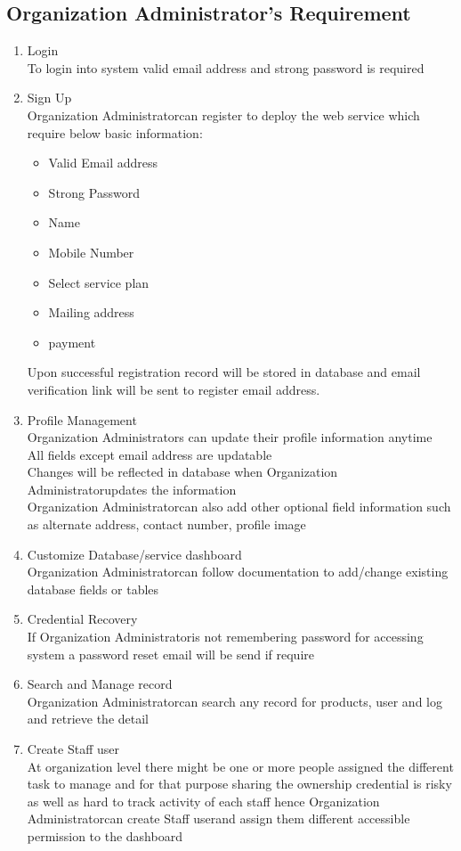 \documentclass{report}
\newcommand*\arrow{\item[$\Rightarrow$]}
\def\admin{Organization Administrator}
\def\staff{Staff user}
\begin{document}
\subsection{\admin's Requirement}
\begin{enumerate}[start=1,label={\bfseries REQ \arabic*:}]
	\addtolength{\itemindent}{40pt}
	\item Login
		\\To login into system valid email address and strong password is required
	\item Sign Up
		\\ \admin \space can register to deploy the web service which require below basic information:
		\begin{itemize}
			\arrow Valid Email address
			\arrow Strong Password
			\arrow Name
			\arrow Mobile Number
			\arrow Select service plan
			\arrow Mailing address
			\arrow payment
		\end{itemize}
		Upon successful registration record will be stored in database and email verification link will be sent to register email address.
	\item Profile Management
		\\ \admin s can update their profile information anytime
		\\All fields except email address are updatable
		\\Changes will be reflected in database when \admin \space updates the information
		\\ \admin can also add other optional field information such as alternate address, contact number, profile image
	\item Customize Database/service dashboard
		\\ \admin \space can follow documentation to add/change existing database fields or tables
	\item Credential Recovery
		\\If \admin \space is not remembering password for accessing system a password reset email will be send if require 
	\item Search and Manage record
		\\ \admin \space can search any record for products, user and log and retrieve the detail 
	\item Create \staff
		\\At organization level there might be one or more people assigned the different task to manage and for that purpose sharing the ownership credential is risky as well as hard to track activity of each staff hence \admin \space can create \staff \space and assign them different accessible permission to the dashboard

\end{enumerate}
\end{document}
